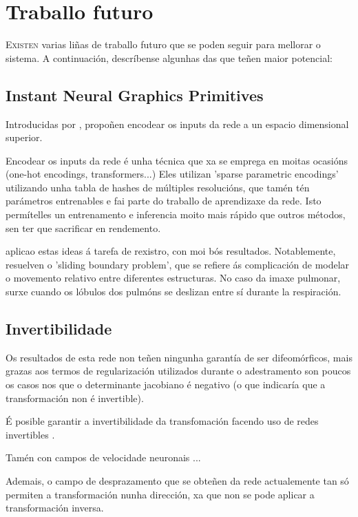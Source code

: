 \chapter{Traballo futuro}
\label{chap:Traballo futuro}

\lettrine{E}{xisten} varias liñas de traballo futuro que se poden seguir para mellorar o sistema.
A continuación, descríbense algunhas das que teñen maior potencial:

\section{Instant Neural Graphics Primitives}
\label{sec:Instant Neural Graphics Primitives}

Introducidas por \cite{mueller2022instant}, propoñen encodear os inputs da rede a un espacio dimensional superior.

Encodear os inputs da rede é unha técnica que xa se emprega en moitas ocasións (one-hot encodings, transformers...)
Eles utilizan 'sparse parametric encodings' utilizando unha tabla de hashes de múltiples resolucións, que tamén tén parámetros entrenables e fai parte do traballo de aprendizaxe da rede.
Isto permítelles un entrenamento e inferencia moito mais rápido que outros métodos, sen ter que sacrificar en rendemento.

\cite{li2024neuralgraphicsprimitivesdeformable} aplicao estas ideas á tarefa de rexistro, con moi bós resultados.
Notablemente, resuelven o 'sliding boundary problem', que se refiere ás complicación de modelar o movemento relativo entre diferentes estructuras. 
No caso da imaxe pulmonar, surxe cuando os lóbulos dos pulmóns se deslizan entre sí durante la respiración.



\section{Invertibilidade}
\label{sec:Invertibilidade}

Os resultados de esta rede non teñen ningunha garantía de ser difeomórficos, 
mais grazas aos termos de regularización utilizados durante o adestramento son poucos os casos nos que o determinante jacobiano é negativo (o que indicaría que a transformación non é invertible).

É posible garantir a invertibilidade da transfomación facendo uso de redes invertibles \cite{jacobsen2018irevnetdeepinvertiblenetworks}.

Tamén con campos de velocidade neuronais \cite{sun2024medicalimageregistrationneural} ...

Ademais, o campo de desprazamento que se obteñen da rede actualemente tan só permiten a transformación nunha dirección, xa que non se pode aplicar a transformación inversa.